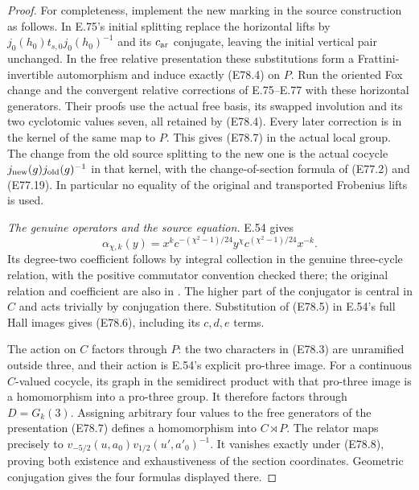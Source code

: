 \begin{proof}
For completeness, implement the new marking in
the source construction as follows. In E.75's
initial splitting replace the horizontal lifts
by $j_0(h_0)t_{s,0}j_0(h_0)^{-1}$ and its
$c_{\rm ar}$ conjugate, leaving the initial
vertical pair unchanged. In the free relative
presentation these substitutions form a
Frattini-invertible automorphism and induce
exactly (E78.4) on $P$.
Run the oriented Fox change and the convergent
relative corrections of E.75--E.77 with these
horizontal generators. Their proofs use the
actual free basis, its swapped involution and
its two cyclotomic values seven, all retained
by (E78.4). Every later correction is in the
kernel of the same map to $P$.
This gives (E78.7) in the actual local group.
The change from the old source splitting to
the new one is the actual cocycle
$j_{\rm new}(g)j_{\rm old}(g)^{-1}$ in that
kernel, with the change-of-section formula
of (E77.2) and (E77.19).
In particular no equality of the original
and transported Frobenius lifts is used.

\emph{The genuine operators and the source equation.}
E.54 gives
\[
\alpha_{\chi,k}(y)=
 x^k c^{-(\chi^2-1)/24}y^\chi
 c^{(\chi^2-1)/24}x^{-k}.
\]
Its degree-two coefficient follows by integral
collection in the genuine three-cycle relation,
with the positive commutator convention checked
there; the original relation and coefficient are
also in \cite[Theorem2, equation(5), \S3 and
Corollary12]{A_Furusho2010Hexagon}.
The higher part of the conjugator is central
in $C$ and acts trivially by conjugation there.
Substitution of (E78.5) in E.54's full Hall
images gives (E78.6), including its
$c,d,e$ terms.

The action on $C$ factors through $P$:
the two characters in (E78.3) are unramified
outside three, and their action is E.54's
explicit pro-three image. For a continuous
$C$-valued cocycle, its graph in the
semidirect product with that pro-three image
is a homomorphism into a pro-three group.
It therefore factors through $D=G_k(3)$.
Assigning arbitrary four values to the free
generators of the presentation (E78.7)
defines a homomorphism into $C\rtimes P$.
The relator maps precisely to
$v_{-5/2}(u,a_0)v_{1/2}(u',a'_0)^{-1}$.
It vanishes exactly under (E78.8), proving
both existence and exhaustiveness of the
section coordinates. Geometric conjugation
gives the four formulas displayed there.


\end{proof}
